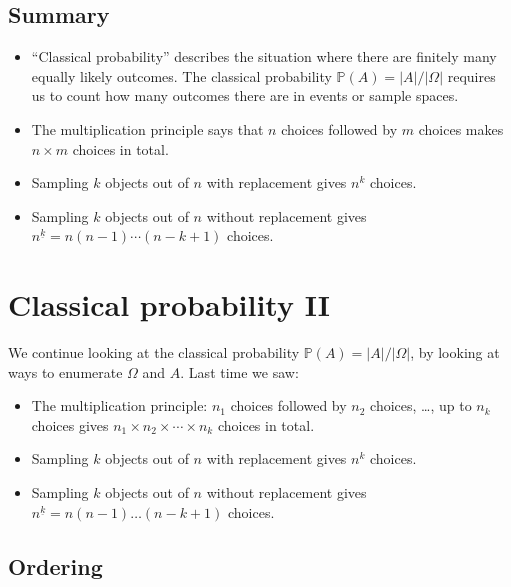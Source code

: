 \documentclass[
  letterpaper,
]{report}
\providecommand{\tightlist}{%
  \setlength{\itemsep}{0pt}\setlength{\parskip}{0pt}}\usepackage{longtable,booktabs,array}
\theoremstyle{definition}
\theoremstyle{definition}
\theoremstyle{remark}
\begin{document}
\hypertarget{summary-L05}{%
\section*{Summary}\label{summary-L05}}


\begin{itemize}
\tightlist
\item
  ``Classical probability'' describes the situation where there are
  finitely many equally likely outcomes. The classical probability
  \(\mathbb P(A) = |A|/|\Omega|\) requires us to count how many outcomes
  there are in events or sample spaces.
\item
  The multiplication principle says that \(n\) choices followed by \(m\)
  choices makes \(n \times m\) choices in total.
\item
  Sampling \(k\) objects out of \(n\) with replacement gives \(n^k\)
  choices.
\item
  Sampling \(k\) objects out of \(n\) without replacement gives
  \(n^{\underline{k}} = n(n-1)\cdots(n-k+1)\) choices.
\end{itemize}

\hypertarget{L06-classical-ii}{%
\chapter{Classical probability II}\label{L06-classical-ii}}

We continue looking at the classical probability
\(\mathbb P(A) = |A|/|\Omega|\), by looking at ways to enumerate
\(\Omega\) and \(A\). Last time we saw:

\begin{itemize}
\tightlist
\item
  The multiplication principle: \(n_1\) choices followed by \(n_2\)
  choices, \ldots, up to \(n_k\) choices gives
  \(n_1 \times n_2 \times \cdots \times n_k\) choices in total.
\item
  Sampling \(k\) objects out of \(n\) with replacement gives \(n^k\)
  choices.
\item
  Sampling \(k\) objects out of \(n\) without replacement gives
  \(n^{\underline{k}} = n(n-1)\dots(n-k+1)\) choices.
\end{itemize}

\hypertarget{ordering}{%
\section{Ordering}\label{ordering}}
\end{document}
